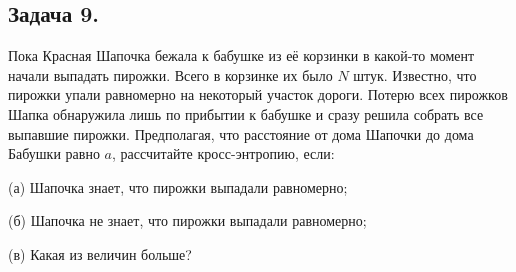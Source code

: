 \subsection*{Задача 9.} Пока Красная Шапочка бежала к бабушке из её корзинки в какой-то момент начали выпадать пирожки. Всего в корзинке их было $N$ штук. Известно, что пирожки упали равномерно на некоторый участок дороги. Потерю всех пирожков Шапка обнаружила лишь по прибытии к бабушке и сразу решила собрать все выпавшие пирожки. Предполагая, что расстояние от дома Шапочки до дома Бабушки равно $a$, рассчитайте кросс-энтропию, если:

(а) Шапочка знает, что пирожки выпадали равномерно;

(б) Шапочка не знает, что пирожки выпадали равномерно;

(в) Какая из величин больше?
